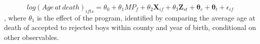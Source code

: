 $$
log(Age\,at\,death)_{ifts} = \theta_0 + \theta_1MP_f + \theta_2\mathbf{X}_{if} + \theta_3\mathbf{Z}_{st} + \mathbf{\theta}_c + \mathbf{\theta}_t + \epsilon_{if}
$$
, where $\theta_1$ is the effect of the program, identified by comparing the average age at death of accepted to rejected boys within county and year of birth, conditional on other observables.
